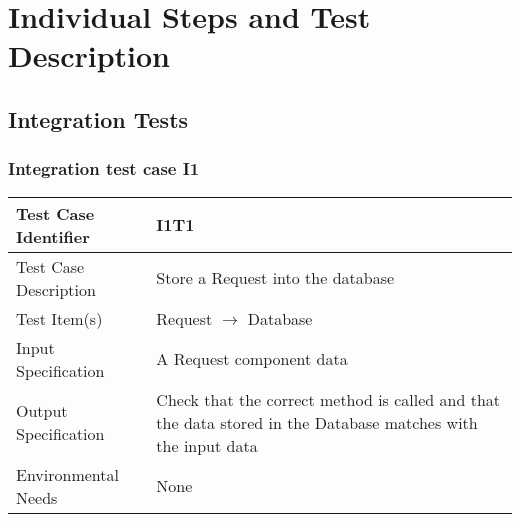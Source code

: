 \section{Individual Steps and Test Description}
	\subsection{Integration Tests}
		\subsubsection{Integration test case I1}
		\begin{center}
			\begin{tabular}{ |l p{10cm}| } \hline
				Test Case Identifier & I1T1 \\ \hline
				Test Case Description & Store a Request into the database \\ \hline
				Test Item(s) & Request $\rightarrow$ Database \\ \hline
				Input Specification & A Request component data \\ \hline
				Output Specification & Check that the correct method is called and that the data stored in the Database 
				matches with the input data \\ \hline
				Environmental Needs & None \\ \hline
			\end{tabular}
		\end{center}
